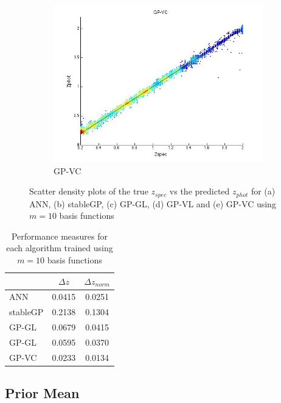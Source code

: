 \documentclass[useAMS,usenatbib,fleqn]{mn2e}
\begin{document}
\begin{figure}
\begin{subfigure}[b]{110px}
                \includegraphics[trim = 35px 15px 50px 25px, clip=true,width=\textwidth]{GPVC.jpg}
                \caption{GP-VC}
        \end{subfigure}
        
        \caption{Scatter density plots of the true $z_{spec}$ vs the predicted $z_{phot}$ for (a) ANN, (b) stableGP, (c) GP-GL, (d) GP-VL and (e) GP-VC using $m=10$ basis functions}
        \label{fig-experiment-1}
\end{figure}

 \begin{table}
\caption{Performance measures for each algorithm trained using $m=10$ basis functions}
\begin{center}
  \begin{tabular}{| l | c | c | }
     				&	$\Delta z$	&	$\Delta z_{norm}$	\\	\hline
	ANN		&	0.0415		&	0.0251				\\	 
	stableGP	&	0.2138		&	0.1304				\\ 
	GP-GL		&	0.0679		&	0.0415				\\
	GP-GL		&	0.0595		&	0.0370				\\
	GP-VC	&	0.0233		&	0.0134				\\	\hline
  \end{tabular}
  \label{table-experiment-1}
\end{center}
\end{table}

\subsection{Prior Mean}
\end{document}
